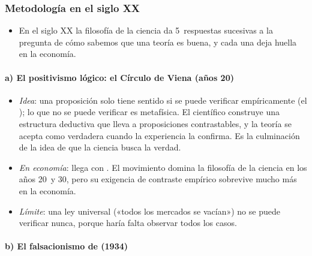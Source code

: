 \documentclass[11pt]{article}
\begin{document}
\subsubsection{Metodología en el siglo XX}\label{sec:siglo-xx}

\begin{itemize}
\item En el siglo XX la filosofía de la ciencia da 5~respuestas sucesivas a la pregunta de cómo sabemos que una teoría es buena, y cada una deja huella en la economía.
\end{itemize}

\paragraph{a) El positivismo lógico: el Círculo de Viena (años 20)}

\begin{itemize}
\item \emph{Idea}: una proposición solo tiene sentido si se puede verificar empíricamente (el ); lo que no se puede verificar es metafísica. El científico construye una estructura deductiva que lleva a proposiciones contrastables, y la teoría se acepta como verdadera cuando la experiencia la confirma. Es la culminación de la idea de que la ciencia busca la verdad.
\item \emph{En economía}: llega con \textcite{Hutchison1938Significance}. El movimiento domina la filosofía de la ciencia en los años 20~y 30, pero su exigencia de contraste empírico sobrevive mucho más en la economía.
\item \emph{Límite}: una ley universal («todos los mercados se vacían») no se puede verificar nunca, porque haría falta observar todos los casos.
\end{itemize}

\paragraph{b) El falsacionismo de  (1934)}
\end{document}
